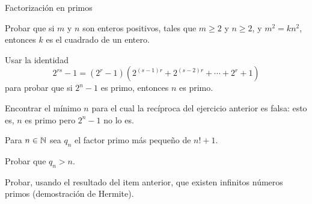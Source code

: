 \begin{section}{Factorización en primos}
\begin{enumex}
\item Probar que si $m$ y $n$ son enteros positivos, tales que $m\ge 2$ y $n \ge 2$, y
$m^2 = kn^2$, entonces $k$ es el cuadrado de un entero.

\item Usar la identidad
$$
2^{rs} -1 = (2^r-1) (2^{(s-1)r}+2^{(s-2)r}+\cdots +2^r+1)
$$
para probar que si $2^n-1$ es primo, entonces $n$ es primo.

\item Encontrar el mínimo $n$ para el cual la recíproca del ejercicio anterior
es falsa: esto es, $n$ es primo pero $2^n-1$ no lo es.

\item Para $n \in \mathbb N$ sea $q_n$ el factor primo más pequeño de $n! + 1$. 
    \begin{enumex}
        \item Probar que $q_n >n$.
        \item Probar, usando el resultado del item anterior, que existen infinitos números primos (demostración de Hermite). 
    \end{enumex}
\end{enumex}

\end{section}    
    

